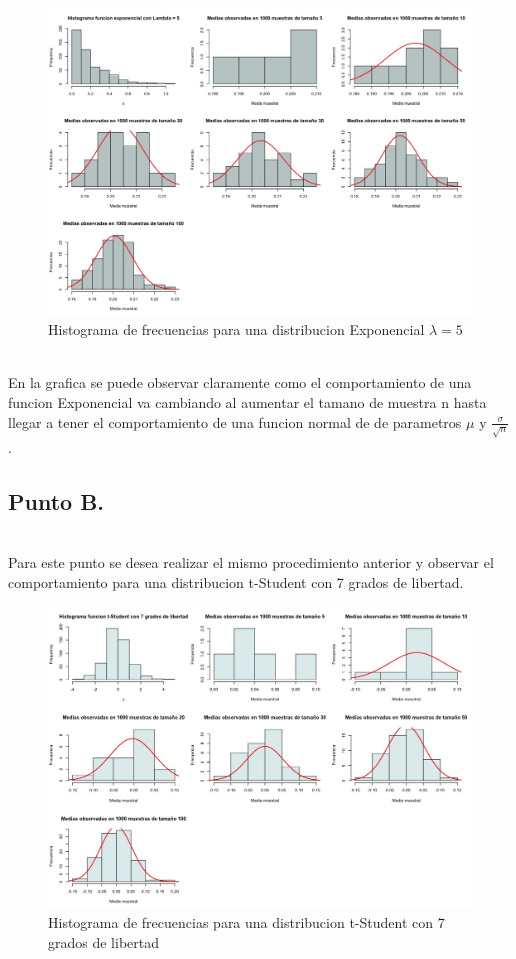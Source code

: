 \documentclass[letterpaper,12pt,onecolumn,titlepage]{article}
\begin{document}
\begin{figure}[!h]
    \begin{center}
        \includegraphics[width=15cm]{figuras/4.jpeg}
        \caption{Histograma de frecuencias para una distribucion Exponencial $\lambda=5$}
        \label{fig:Densidad}
    \end{center}
\end{figure}

~\\En la grafica se puede observar claramente como el comportamiento de una funcion Exponencial va cambiando al aumentar el tamano de muestra n hasta llegar a tener el comportamiento de una funcion normal de de parametros $\mu$ y $\frac{\sigma}{\sqrt{n}}$. 
\pagebreak\subsection{Punto B.}
~\\ Para este punto se desea realizar el mismo procedimiento anterior y observar el comportamiento para una distribucion t-Student con 7 grados de libertad.
\begin{figure}[!h]
    \begin{center}
        \includegraphics[width=15cm]{figuras/4b.jpeg}
        \caption{Histograma de frecuencias para una distribucion t-Student con 7 grados de libertad}
        \label{fig:Densidad}
    \end{center}
\end{figure}
\end{document}
